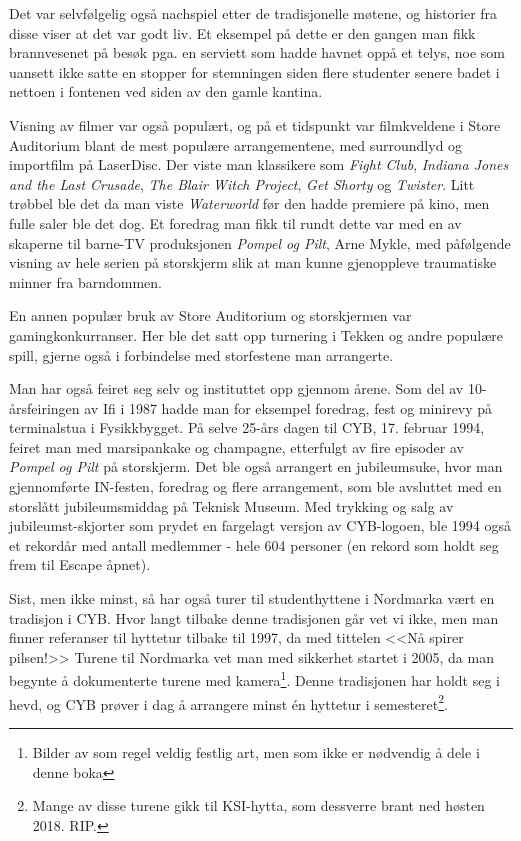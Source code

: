 Det var selvfølgelig også nachspiel etter de tradisjonelle møtene, og historier fra disse viser at det var godt liv. Et eksempel på dette er den gangen man fikk brannvesenet på besøk pga. en serviett som hadde havnet oppå et telys, noe som uansett ikke satte en stopper for stemningen siden flere studenter senere badet i nettoen i fontenen ved siden av den gamle kantina.

Visning av filmer var også populært, og på et tidspunkt var filmkveldene i Store Auditorium blant de mest populære arrangementene, med surroundlyd og importfilm på LaserDisc. Der viste man klassikere som \textit{Fight Club}, \textit{Indiana Jones and the Last Crusade}, \textit{The Blair Witch Project}, \textit{Get Shorty} og \textit{Twister}. Litt trøbbel ble det da man viste \textit{Waterworld} før den hadde premiere på kino, men fulle saler ble det dog. Et foredrag man fikk til rundt dette var med en av skaperne til barne-TV produksjonen \textit{Pompel og Pilt}, Arne Mykle, med påfølgende visning av hele serien på storskjerm slik at man kunne gjenoppleve traumatiske minner fra barndommen.

En annen populær bruk av Store Auditorium og storskjermen var gamingkonkurranser. Her ble det satt opp turnering i Tekken og andre populære spill, gjerne også i forbindelse med storfestene man arrangerte.

Man har også feiret seg selv og instituttet opp gjennom årene. Som del av 10-årsfeiringen av Ifi i 1987 hadde man for eksempel foredrag, fest og minirevy på terminalstua i Fysikkbygget. På selve 25-års dagen til CYB, 17. februar 1994, feiret man med marsipankake og champagne, etterfulgt av fire episoder av \textit{Pompel og Pilt} på storskjerm. Det ble også arrangert en jubileumsuke, hvor man gjennomførte IN-festen, foredrag og flere arrangement, som ble avsluttet med en storslått jubileumsmiddag på Teknisk Museum. Med trykking og salg av jubileumst-skjorter som prydet en fargelagt versjon av CYB-logoen, ble 1994 også et rekordår med antall medlemmer - hele 604 personer (en rekord som holdt seg frem til Escape åpnet).

Sist, men ikke minst, så har også turer til studenthyttene i Nordmarka vært en tradisjon i CYB. Hvor langt tilbake denne tradisjonen går vet vi ikke, men man finner referanser til hyttetur tilbake til 1997, da med tittelen <<Nå spirer pilsen!>> Turene til Nordmarka vet man med sikkerhet startet i 2005, da man begynte å dokumenterte turene med kamera\footnote{Bilder av som regel veldig festlig art, men som ikke er nødvendig å dele i denne boka}. Denne tradisjonen har holdt seg i hevd, og CYB prøver i dag å arrangere minst én hyttetur i semesteret\footnote{Mange av disse turene gikk til KSI-hytta, som dessverre brant ned høsten 2018. RIP.}.


